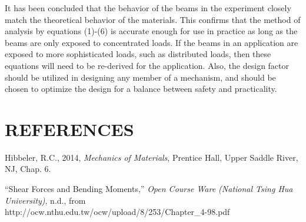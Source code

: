 \documentclass[12pt]{article}
\begin{document}
It has been concluded that the behavior of the beams in the experiment closely match the theoretical behavior of the materials. This confirms that the method of analysis by equations (1)-(6) is accurate enough for use in practice as long as the beams are only exposed to concentrated loads. If the beams in an application are exposed to more sophisticated loads, such as distributed loads, then these equations will need to be re-derived for the application. Also, the design factor should be utilized in designing any member of a mechanism, and should be chosen to optimize the design for a balance between safety and practicality.
\bigskip


\section*{\fontsize{12}{12}\selectfont REFERENCES}

\begin{thebibliography}{2}

\bibitem{}
Hibbeler, R.C., 2014, \emph{Mechanics of Materials}, Prentice Hall, Upper Saddle River, NJ, Chap. 6.

\bibitem{}
“Shear Forces and Bending Moments,” \emph{Open Course Ware (National Tsing Hua University)}, n.d., from
\\http://ocw.nthu.edu.tw/ocw/upload/8/253/Chapter\_4-98.pdf


\end{thebibliography}


\end{document}
